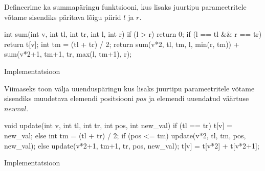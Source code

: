 \documentclass{trkut}
\theoremstyle{definition}
\begin{document}
Defineerime ka summapäringu funktsiooni, kus lisaks juurtipu parameetritele võtame sisendiks päritava lõigu piirid $l$ ja $r$.
\begin{cclol}
int sum(int v, int tl, int tr, int l, int r) {
    if (l > r) 
        return 0;
    if (l == tl && r == tr) {
        return t[v];
    }
    int tm = (tl + tr) / 2;
    return sum(v*2, tl, tm, l, min(r, tm))
           + sum(v*2+1, tm+1, tr, max(l, tm+1), r);
}
\end{cclol}
 \begin{kk}[H]%
    \caption{Implementatsioon}%
    \label{EMaxx}%
    \end{kk}
Viimaseks toon välja uuenduspäringu kus lisaks juurtipu parameetritele võtame sisendiks muudetava elemendi positsiooni $pos$ ja elemendi uuendatud väärtuse $new$\textunderscore$val$.
\begin{cclol}
void update(int v, int tl, int tr, int pos, int new_val) {
    if (tl == tr) {
        t[v] = new_val;
    } else {
        int tm = (tl + tr) / 2;
        if (pos <= tm)
            update(v*2, tl, tm, pos, new_val);
        else
            update(v*2+1, tm+1, tr, pos, new_val);
        t[v] = t[v*2] + t[v*2+1];
    }
}
\end{cclol}
 \begin{kk}[H]%
    \caption{Implementatsioon}%
    \label{EMaxx}%
    \end{kk}
\end{document}
